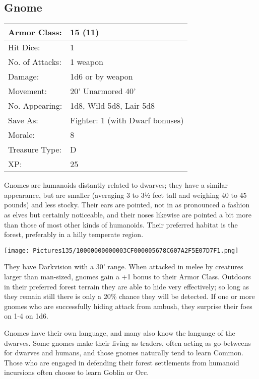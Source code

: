 \documentclass[a4paper,twoside,openany,10pt]{book}
\begin{document}
\begin{multicols}{2}
\subsection*{Gnome}\label{gnome}

\begin{tabularx}{0.48\textwidth}{@{}lX@{}}
Armor Class: & 15 (11) \\\hline
Hit Dice: & 1 \\\hline
No. of Attacks: & 1 weapon \\\hline
Damage: & 1d6 or by weapon \\\hline
Movement: & 20' Unarmored 40' \\\hline
No. Appearing: & 1d8, Wild 5d8, Lair 5d8 \\\hline
Save As: & Fighter: 1 (with Dwarf bonuses) \\\hline
Morale: & 8 \\\hline
Treasure Type: & D \\\hline
XP: & 25 \\\hline
\end{tabularx}\medskip

Gnomes are humanoids distantly related to dwarves; they have a similar appearance, but are smaller (averaging 3 to 3½ feet tall and weighing 40 to 45 pounds) and less stocky. Their ears are pointed, not in as pronounced a fashion as elves but certainly noticeable, and their noses likewise are pointed a bit more than those of most other kinds of humanoids. Their preferred habitat is the forest, preferably in a hilly temperate region.


\begin{center}
	\texttt{[image: Pictures135/10000000000003CF000005678C607A2F5E07D7F1.png]}
\end{center}

They have Darkvision with a 30' range. When attacked in melee by creatures larger than man-sized, gnomes gain a +1 bonus to their Armor Class. Outdoors in their preferred forest terrain they are able to hide very effectively; so long as they remain still there is only a 20\% chance they will be detected. If one or more gnomes who are successfully hiding attack from ambush, they surprise their foes on 1-4 on 1d6.

Gnomes have their own language, and many also know the language of the dwarves. Some gnomes make their living as traders, often acting as go-betweens for dwarves and humans, and those gnomes naturally tend to learn Common. Those who are engaged in defending their forest settlements from humanoid incursions often choose to learn Goblin or Orc.


\end{multicols}
\end{document}
